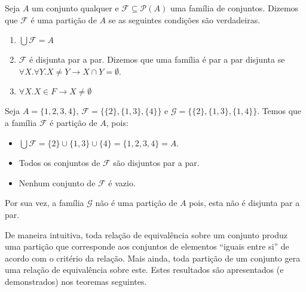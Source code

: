 \begin{Definition}[Partição]\label{partdef}
Seja $A$ um conjunto qualquer e $\mathcal{F}\subseteq \mathcal{P}(A)$
uma família de conjuntos. Dizemos que $\mathcal{F}$ é uma partição de
$A$ se as seguintes condições são verdadeiras.
\begin{enumerate}
  \item $\bigcup\mathcal{F} = A$
  \item $\mathcal{F}$ é disjunta par a par. Dizemos que uma família é
    par a par disjunta se $\forall X. \forall Y. X \neq Y \to X \cap Y
    = \emptyset$.
  \item $\forall X. X\in F \to X \neq \emptyset$
\end{enumerate}
\end{Definition}
\begin{Example}
Seja $A = \{1,2,3,4\}$, $\mathcal{F} =\{\{2\},\{1,3\},\{4\}\}$ e
$\mathcal{G} =\{\{2\},\{1,3\},\{1,4\}\}$. Temos que a família
$\mathcal{F}$ é  partição de $A$, pois:
\begin{itemize}
  \item $\bigcup \mathcal{F} = \{2\} \cup \{1,3\} \cup \{4\} =
    \{1,2,3,4\} = A$.
  \item Todos os conjuntos de $\mathcal{F}$ são disjuntos par a par.
  \item Nenhum conjunto de $\mathcal{F}$ é vazio.
\end{itemize}
Por sua vez, a família $\mathcal{G}$ não é uma partição de $A$ pois,
esta não é disjunta par a par.
\end{Example}

De maneira intuitiva, toda relação de equivalência sobre um conjunto
produz uma partição que corresponde aos conjuntos de elementos
``iguais entre si'' de acordo com o critério da relação. Mais ainda,
toda partição de um conjunto gera uma relação de equivalência sobre
este. Estes resultados são apresentados (e demonstrados) nos teoremas
seguintes.


